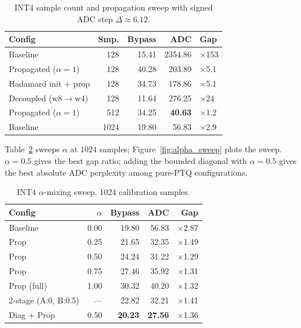 \documentclass[letterpaper]{article} %
\theoremstyle{plain}
\begin{document}
\begin{table}[htbp]
\centering
\setlength{\tabcolsep}{4pt}
\begin{tabular}{@{}lrrrl@{}}
\toprule
\textbf{Config} & \textbf{Smp.} & \textbf{Bypass} & \textbf{ADC} & \textbf{Gap} \\
\midrule
Baseline                  & 128  & 15.41 & 2354.86 & $\times$153 \\
Propagated ($\alpha=1$)   & 128  & 40.28 & 203.89  & $\times$5.1 \\
Hadamard init + prop      & 128  & 34.73 & 178.86  & $\times$5.1 \\
Decoupled (w8$\to$w4)     & 128  & 11.64 & 276.25  & $\times$24 \\
Propagated ($\alpha=1$)   & 512  & 34.25 & \textbf{40.63} & $\times$1.2 \\
Baseline                  & 1024 & 19.80 & 56.83   & $\times$2.9 \\
\bottomrule
\end{tabular}
\caption{INT4 sample count and propagation sweep with signed ADC step $\Delta\approx6.12$.}
\label{tab:int4v1}
\end{table}

Table~\ref{tab:int4v2} sweeps $\alpha$ at $1024$ samples; Figure~\ref{fig:alpha_sweep} plots the sweep. $\alpha=0.5$ gives the best gap ratio; adding the bounded diagonal with $\alpha=0.5$ gives the best absolute ADC perplexity among pure-PTQ configurations.

\begin{table}[htbp]
\centering
\begin{tabular}{@{}lrrrr@{}}
\toprule
\textbf{Config} & \textbf{$\alpha$} & \textbf{Bypass} & \textbf{ADC} & \textbf{Gap} \\
\midrule
Baseline                  & 0.00 & 19.80 & 56.83 & $\times$2.87 \\
Prop                      & 0.25 & 21.65 & 32.35 & $\times$1.49 \\
Prop                      & 0.50 & 24.24 & 31.22 & $\times$1.29 \\
Prop                      & 0.75 & 27.46 & 35.92 & $\times$1.31 \\
Prop (full)               & 1.00 & 30.32 & 40.20 & $\times$1.32 \\
2-stage (A:0, B:0.5)      & ---  & 22.82 & 32.21 & $\times$1.41 \\
Diag + Prop               & 0.50 & \textbf{20.23} & \textbf{27.56} & $\times$1.36 \\
\bottomrule
\end{tabular}
\caption{INT4 $\alpha$-mixing sweep. 1024 calibration samples.}
\label{tab:int4v2}
\end{table}
\end{document}

